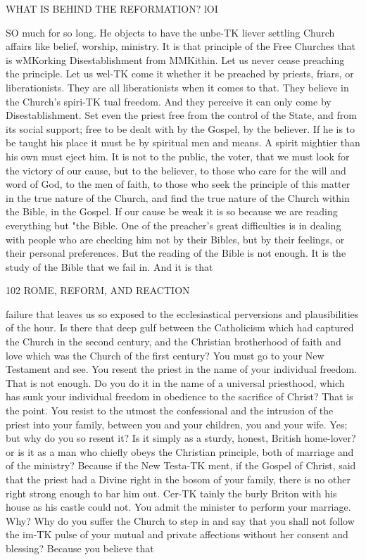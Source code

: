 \documentclass[12pt,a5paper,twoside]{book}
\begin{document}
WHAT IS BEHIND THE REFORMATION? lOI 

SO much for so long. He objects to have the unbe-TK
liever settling Church affairs like belief, worship, 
ministry. It is that principle of the Free Churches 
that is wMKorking Disestablishment from MMKithin. Let 
us never cease preaching the principle. Let us wel-TK
come it whether it be preached by priests, friars, or 
liberationists. They are all liberationists when it 
comes to that. They believe in the Church's spiri-TK
tual freedom. And they perceive it can only come 
by Disestablishment. Set even the priest free from 
the control of the State, and from its social support; 
free to be dealt with by the Gospel, by the believer. 
If he is to be taught his place it must be by 
spiritual men and means. A spirit mightier than his 
own must eject him. It is not to the public, the 
voter, that we must look for the victory of our cause, 
but to the believer, to those who care for the will and 
word of God, to the men of faith, to those who seek 
the principle of this matter in the true nature of the 
Church, and find the true nature of the Church within 
the Bible, in the Gospel. If our cause be weak it is 
so because we are reading everything but "the Bible. 
One of the preacher's great difficulties is in dealing with 
people who are checking him not by their Bibles, but 
by their feelings, or their personal preferences. But 
the reading of the Bible is not enough. It is the 
study of the Bible that we fail in. And it is that 



102 ROME, REFORM, AND REACTION 

failure that leaves us so exposed to the ecclesiastical 
perversions and plausibilities of the hour. Is there 
that deep gulf between the Catholicism which had 
captured the Church in the second century, and the 
Christian brotherhood of faith and love which was 
the Church of the first century? You must go to your 
New Testament and see. You resent the priest in 
the name of your individual freedom. That is not 
enough. Do you do it in the name of a universal 
priesthood, which has sunk your individual freedom in 
obedience to the sacrifice of Christ? That is the 
point. You resist to the utmost the confessional and 
the intrusion of the priest into your family, between 
you and your children, you and your wife. Yes; but 
why do you so resent it? Is it simply as a sturdy, 
honest, British home-lover? or is it as a man who 
chiefly obeys the Christian principle, both of marriage 
and of the ministry? Because if the New Testa-TK
ment, if the Gospel of Christ, said that the priest had 
a Divine right in the bosom of your family, there is 
no other right strong enough to bar him out. Cer-TK
tainly the burly Briton with his house as his castle 
could not. You admit the minister to perform your 
marriage. Why? Why do you suffer the Church 
to step in and say that you shall not follow the im-TK
pulse of your mutual and private affections without 
her consent and blessing? Because you believe that 
\end{document}
